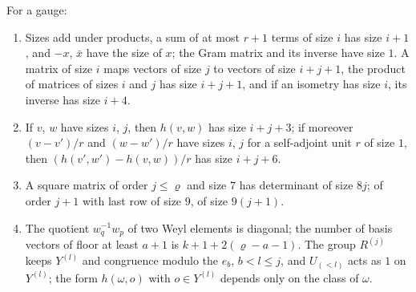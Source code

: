 \begin{lemma}\label{lem:sizes}
For a gauge:
\begin{enumerate}[label=\textup{(\alph*)}]
\item Sizes add under products, a sum of at most $r+1$ terms of size $i$ has size $i+1$, and $-x$, $\bar x$ have the size of $x$; the Gram matrix and its inverse have size $1$. A matrix of size $i$ maps vectors of size $j$
to vectors of size $i+j+1$, the product of matrices of sizes $i$ and $j$ has size $i+j+1$, and if an isometry has size $i$, its inverse has size $i+4$.
\item If $v$, $w$ have sizes $i$, $j$, then $h(v,w)$ has size $i+j+3$; if moreover $(v-v')/r$ and $(w-w')/r$ have sizes $i$, $j$ for a self-adjoint unit $r$ of size $1$, then $(h(v',w')-h(v,w))/r$ has size $i+j+6$.
\item A square matrix of order $j\le\varrho$ and size $7$ has determinant of size $8j$; of order $j+1$ with last row of size $9$, of size $9(j+1)$.
\item The quotient $w_q^{-1}w_p$ of two Weyl elements is diagonal; the number of basis vectors of floor at least $a+1$ is $k+1+2(\varrho-a-1)$. The group $R^{(j)}$ keeps $Y^{(l)}$ and congruence modulo the $e_b$, $b<l\le j$,
and $U_{(<l)}$ acts as $1$ on $Y^{(l)}$; the form $h(\omega,o)$ with $o\in Y^{(l)}$ depends only on the class of $\omega$.
\end{enumerate}
\end{lemma}

